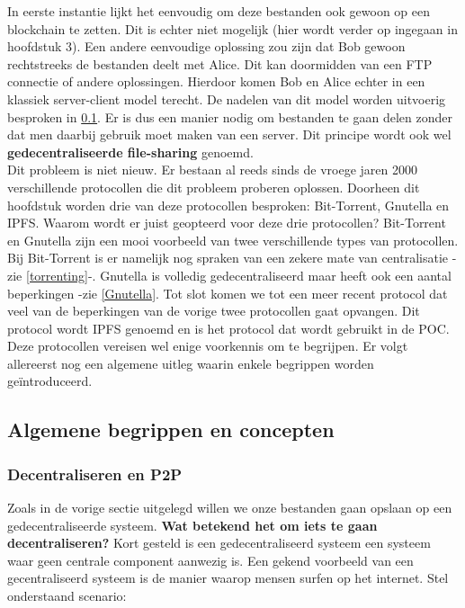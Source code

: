 In eerste instantie lijkt het eenvoudig om deze bestanden ook gewoon op een blockchain te zetten. Dit is echter niet mogelijk (hier wordt verder op ingegaan in hoofdstuk 3). Een andere eenvoudige oplossing zou zijn dat Bob gewoon rechtstreeks de bestanden deelt met Alice. Dit kan doormidden van een FTP connectie of andere oplossingen. Hierdoor komen Bob en Alice echter in een klassiek server-client model terecht. De nadelen van dit model worden uitvoerig besproken in \ref{ipfs_decent}. Er is dus een manier nodig om bestanden te gaan delen zonder dat men daarbij gebruik moet maken van een server. Dit principe wordt ook wel \textbf{gedecentraliseerde file-sharing} genoemd.\\

Dit probleem is niet nieuw. Er bestaan al reeds sinds de vroege jaren 2000 verschillende protocollen die dit probleem proberen oplossen. Doorheen dit hoofdstuk worden drie van deze protocollen besproken: Bit-Torrent, Gnutella en IPFS. Waarom wordt er juist geopteerd voor deze drie protocollen? Bit-Torrent en Gnutella zijn een mooi voorbeeld van twee verschillende types van protocollen. Bij Bit-Torrent is er namelijk nog spraken van een zekere mate van centralisatie -zie \ref{torrenting}-. Gnutella is volledig gedecentraliseerd maar heeft ook een aantal beperkingen -zie \ref{Gnutella}. Tot slot komen we tot een meer recent protocol dat veel van de beperkingen van de vorige twee protocollen gaat opvangen. Dit protocol wordt IPFS genoemd en is het protocol dat wordt gebruikt in de POC. Deze protocollen vereisen wel enige voorkennis om te begrijpen. Er volgt allereerst nog een algemene uitleg waarin enkele begrippen worden geïntroduceerd. \\

\subsection{Algemene begrippen en concepten}
\label{ipfs_decent}

\subsubsection{Decentraliseren en P2P}
Zoals in de vorige sectie uitgelegd willen we onze bestanden gaan opslaan op een gedecentraliseerde systeem. \textbf{Wat betekend het om iets te gaan decentraliseren?} Kort gesteld is een gedecentraliseerd systeem een systeem waar geen centrale component aanwezig is. Een gekend voorbeeld van een gecentraliseerd systeem is de manier waarop mensen surfen op het internet. Stel onderstaand scenario:\\

